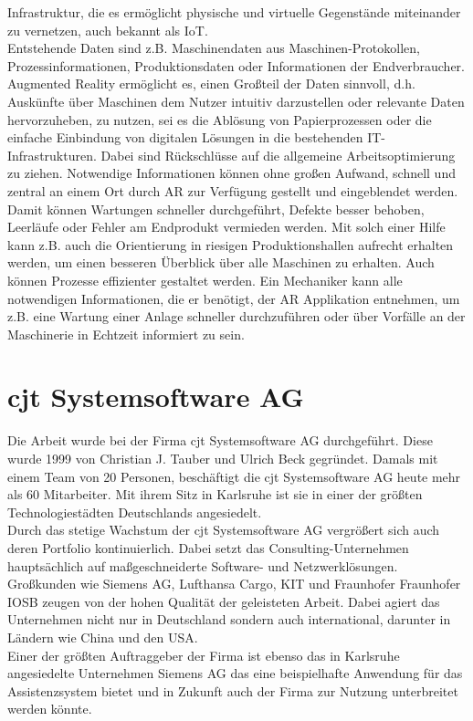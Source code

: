 Infrastruktur, die es ermöglicht physische und virtuelle Gegenstände miteinander zu vernetzen, auch bekannt als \ac{IoT}.
\\ 
Entstehende Daten sind z.B. Maschinendaten aus Maschinen-Protokollen, Prozessinformationen, Produktionsdaten oder 
Informationen der Endverbraucher. \cite{industrie40.2019f} Augmented Reality ermöglicht es, einen Großteil der Daten sinnvoll, d.h. Auskünfte 
über Maschinen dem Nutzer intuitiv darzustellen oder relevante Daten hervorzuheben, zu nutzen, sei es 
die Ablösung von Papierprozessen oder die einfache Einbindung von digitalen Lösungen in die bestehenden IT-Infrastrukturen. \cite{industrie40ar.2019n} 
Dabei sind Rückschlüsse auf die allgemeine Arbeitsoptimierung zu ziehen. Notwendige Informationen können ohne 
großen Aufwand, schnell und zentral an einem Ort durch \acs{AR} zur Verfügung gestellt und eingeblendet werden. Damit können 
Wartungen schneller durchgeführt, Defekte besser behoben, Leerläufe oder Fehler am Endprodukt vermieden werden. Mit solch einer Hilfe 
kann z.B. auch die Orientierung in riesigen Produktionshallen aufrecht erhalten werden, um einen besseren Überblick über alle Maschinen 
zu erhalten. Auch können Prozesse effizienter gestaltet werden. Ein Mechaniker kann alle notwendigen Informationen, die er benötigt, der 
\acl{AR} Applikation entnehmen, um z.B. eine Wartung einer Anlage schneller durchzuführen oder über Vorfälle an der Maschinerie in Echtzeit 
informiert zu sein. 
\pagebreak
\section{cjt Systemsoftware AG}
\label{chap:cjt}
Die Arbeit wurde bei der Firma cjt Systemsoftware AG durchgeführt. Diese wurde
1999 von Christian J. Tauber und Ulrich Beck gegründet. Damals mit einem Team
von 20 Personen, beschäftigt die cjt Systemsoftware AG heute mehr als 60 Mitarbeiter. 
Mit ihrem Sitz in Karlsruhe ist sie in einer der größten Technologiestädten Deutschlands angesiedelt.
\\
\linebreak
Durch das stetige Wachstum der cjt Systemsoftware AG vergrößert sich auch deren
Portfolio kontinuierlich. Dabei setzt das Consulting-Unternehmen hauptsächlich auf maßgeschneiderte
Software- und Netzwerklösungen. Großkunden wie Siemens AG, Lufthansa Cargo,
\ac{KIT} und Fraunhofer \acs{Fraunhofer IOSB} zeugen von der hohen Qualität der geleisteten Arbeit. 
Dabei agiert das Unternehmen nicht nur in Deutschland sondern auch international, darunter in Ländern wie China und den USA.
\\ 
\linebreak
Einer der größten Auftraggeber der Firma ist ebenso das in Karlsruhe angesiedelte Unternehmen Siemens AG das eine beispielhafte 
Anwendung für das Assistenzsystem bietet und in Zukunft auch der Firma zur Nutzung unterbreitet werden könnte. 
\pagebreak

